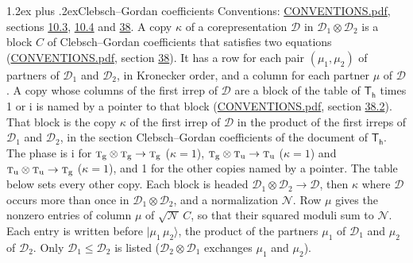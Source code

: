 \documentclass[10pt,a4paper]{article}
\makeatletter
\renewcommand\section{\@startsection{section}{1}{\z@}{-3ex plus -1ex minus -.2ex}%
  {1.2ex plus .2ex}{\normalfont\large\sffamily\bfseries\color{parttitle}}}
\numberwithin{equation}{section}
\newcommand{\grp}[1]{\mathsf{#1}}
\newcommand{\irr}[1]{\text{\normalfont\scshape #1}}
\newcommand{\ptag}[1]{\mathrm{#1}}
\newcommand{\iunit}{\mathrm{i}}
\newcommand{\irrprod}{\otimes}
\newcommand{\mult}{\kappa}
\newcommand{\intx}{\mu}
\newcommand{\cgnorm}{\mathcal{N}}
\newcommand{\prodket}[2]{\lvert {#1}\,{#2}\rangle}
\makeatother
\begin{document}
\section{Clebsch--Gordan coefficients}\label{s:clebsch_gordan}
Conventions: \href{../../CONVENTIONS.pdf}{CONVENTIONS.pdf}, sections \href{../../../rotation/CONVENTIONS.pdf\#conv.10.3}{10.3}, \href{../../../rotation/CONVENTIONS.pdf\#conv.10.4}{10.4} and \href{../../CONVENTIONS.pdf\#conv.38}{38}.
\leavevmode\label{n:index.copy}\label{n:matrix.cg.stored}A copy $\mult$ of a corepresentation $\mathcal{D}$ in $\mathcal{D}_1\irrprod\mathcal{D}_2$ is a block $C$ of Clebsch--Gordan coefficients that satisfies two equations (\href{../../CONVENTIONS.pdf}{CONVENTIONS.pdf}, section \href{../../CONVENTIONS.pdf\#conv.38}{38}). \label{n:index.cg}It has a row for each pair $(\intx_1, \intx_2)$ of partners of $\mathcal{D}_1$ and $\mathcal{D}_2$, in Kronecker order, and a column for each partner $\intx$ of $\mathcal{D}$.
A copy whose columns of the first irrep of $\mathcal{D}$ are a block of the table of $\grp{T_{h}}$ times 1 or $\iunit$ is named by a pointer to that block (\href{../../CONVENTIONS.pdf}{CONVENTIONS.pdf}, section \href{../../CONVENTIONS.pdf\#conv.38.2}{38.2}). That block is the copy $\mult$ of the first irrep of $\mathcal{D}$ in the product of the first irreps of $\mathcal{D}_1$ and $\mathcal{D}_2$, in the section Clebsch--Gordan coefficients of the document of \href{../../../rotation/data/pdf/Th.pdf}{$\grp{T_{h}}$}. The phase is $\iunit$ for $\irr{t}_{\ptag{g}}\irrprod \irr{t}_{\ptag{g}}\to \irr{t}_{\ptag{g}}$ ($\mult = 1$), $\irr{t}_{\ptag{g}}\irrprod \irr{t}_{\ptag{u}}\to \irr{t}_{\ptag{u}}$ ($\mult = 1$) and $\irr{t}_{\ptag{u}}\irrprod \irr{t}_{\ptag{u}}\to \irr{t}_{\ptag{g}}$ ($\mult = 1$), and 1 for the other copies named by a pointer. The table below sets every other copy.
Each block is headed $\mathcal{D}_1\irrprod\mathcal{D}_2\to\mathcal{D}$, then $\mult$ where $\mathcal{D}$ occurs more than once in $\mathcal{D}_1\irrprod\mathcal{D}_2$, and a normalization $\cgnorm$. Row $\intx$ gives the nonzero entries of column $\intx$ of $\sqrt{\cgnorm}\,C$, so that their squared moduli sum to $\cgnorm$. \label{n:vector.ket.product}Each entry is written before $\prodket{\intx_1}{\intx_2}$, the product of the partners $\intx_1$ of $\mathcal{D}_1$ and $\intx_2$ of $\mathcal{D}_2$. Only $\mathcal{D}_1 \le \mathcal{D}_2$ is listed ($\mathcal{D}_2\irrprod\mathcal{D}_1$ exchanges $\intx_1$ and $\intx_2$).
\end{document}
